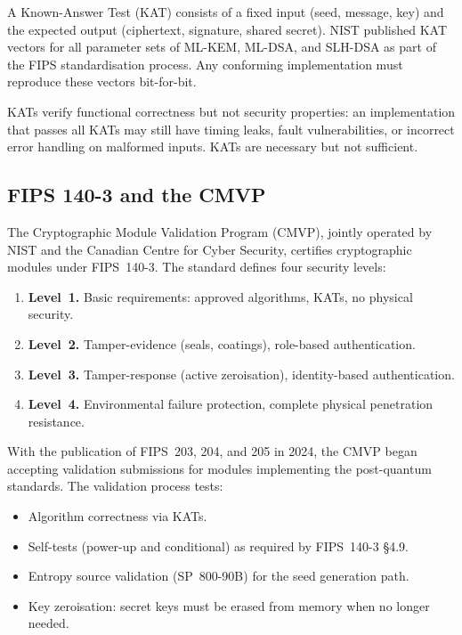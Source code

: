 A Known-Answer Test (KAT) consists of a fixed input (seed, message, key) and the expected output (ciphertext, signature, shared secret).  NIST published KAT vectors for all parameter sets of ML-KEM, ML-DSA, and SLH-DSA as part of the FIPS standardisation process.  Any conforming implementation must reproduce these vectors bit-for-bit.

KATs verify functional correctness but not security properties: an implementation that passes all KATs may still have timing leaks, fault vulnerabilities, or incorrect error handling on malformed inputs.  KATs are necessary but not sufficient.

\subsection{FIPS 140-3 and the CMVP}
\label{subsec:fips140}

The Cryptographic Module Validation Program (CMVP), jointly operated by NIST and the Canadian Centre for Cyber Security, certifies cryptographic modules under FIPS~140-3.  The standard defines four security levels:

\begin{enumerate}
\item \textbf{Level~1.}  Basic requirements: approved algorithms, KATs, no physical security.
\item \textbf{Level~2.}  Tamper-evidence (seals, coatings), role-based authentication.
\item \textbf{Level~3.}  Tamper-response (active zeroisation), identity-based authentication.
\item \textbf{Level~4.}  Environmental failure protection, complete physical penetration resistance.
\end{enumerate}

With the publication of FIPS~203, 204, and 205 in 2024, the CMVP began accepting validation submissions for modules implementing the post-quantum standards.  The validation process tests:
\begin{itemize}
\item Algorithm correctness via KATs.
\item Self-tests (power-up and conditional) as required by FIPS~140-3 \S4.9.
\item Entropy source validation (SP~800-90B) for the seed generation path.
\item Key zeroisation: secret keys must be erased from memory when no longer needed.
\end{itemize}

